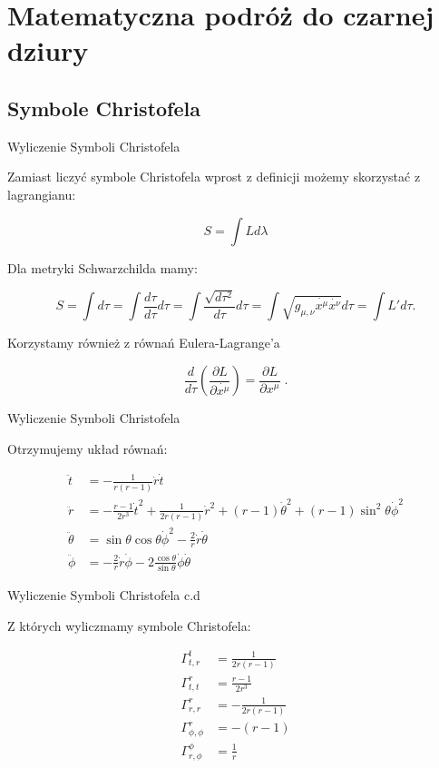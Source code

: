 \documentclass[polish, 9pt, xcolor=table, hyperref={pdfpagemode=FullScreen}]{beamer}
\begin{document}
\section{Matematyczna podróż do czarnej dziury}

\subsection{Symbole Christofela}

\begin{frame}{Wyliczenie Symboli Christofela}

Zamiast liczyć symbole Christofela wprost z definicji możemy skorzystać z lagrangianu:

$$ S = \int L d \lambda $$

Dla metryki Schwarzchilda mamy:

$$ S = \int d \tau= \int \frac{d \tau}{d \tau} d \tau = \int \frac{\sqrt{d \tau^2}}{d \tau} d \tau = \int \sqrt{g_{\mu, \nu}\dot{x^\mu} \dot{x^\nu}}d \tau = \int L' d \tau. $$

Korzystamy również z równań Eulera-Lagrange'a

$$\frac{d}{ d \tau}\left(\frac{\partial L}{\partial \dot{x^\mu}}\right)= \frac{\partial L}{\partial x^\mu}\; . $$

\end{frame}

\begin{frame}{Wyliczenie Symboli Christofela}

Otrzymujemy układ równań:

\begin{align*}
  \ddot{t}&=-\frac{1}{r(r-1)}\dot{r}\dot{t}\\
  \ddot{r}&=-\frac{r-1}{ 2r^3} \dot{t}^2+\frac{1}{2r(r-1)}\dot{r}^2+(r-1)\dot{\theta}^2+(r-1)\sin^2\theta \dot{\phi}^2\\
  \ddot{\theta} &= \sin \theta \cos \theta \dot{\phi}^2 - \frac{2}{ r} \dot{r}\dot{\theta}\\
  \ddot{\phi} &= -\frac{2}{r} \dot{r}\dot{\phi} - 2 \frac{\cos \theta}{ \sin \theta} \dot{\phi}  \dot{\theta} 
\end{align*}

\end{frame}

\begin{frame}{Wyliczenie Symboli Christofela c.d}

Z których wyliczmamy symbole Christofela:

\begin{align*}
  \Gamma_{t,r}^t&=\frac{1}{2r(r-1)}\\ 
  \Gamma_{t,t}^r&=\frac{r-1}{2r^3}\\ 
  \Gamma_{r,r}^r&=-\frac{1}{2r(r-1)}\\ 
  \Gamma_{\phi,\phi}^r&=-(r-1)\\ 
  \Gamma_{r,\phi}^\phi&=\frac{1}{r} 
\end{align*}

\end{frame}
\end{document}
